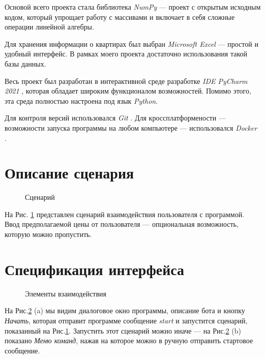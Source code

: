 \documentclass{article}
\begin{document}
		Основой всего проекта стала библиотека \textit{NumPy} \cite{litlink3} --- проект с открытым исходным кодом, который упрощает работу с массивами и включает в себя сложные операции линейной алгебры. 
		
		Для хранения информации о квартирах был выбран \textit{Microsoft Excel} \cite{litlink4} --- простой и удобный интерфейс. В рамках моего проекта достаточно использования такой базы данных.
		
		Весь проект был разработан в интерактивной среде разработке \textit{IDE PyCharm 2021} \cite{litlink5}, которая обладает широким функционалом возможностей. Помимо этого, эта среда полностью настроена под язык \textit{Python}.
		
		Для контроля версий использовался \textit{Git} \cite{litlink6}. Для кроссплатформености --- возможности запуска программы на любом компьютере --- использовался \textit{Docker} \cite{litlink7}.

	\newpage
	\section {Описание сценария}
	
		\begin{figure}[H]
			\centering
			\caption{Сценарий}
			\label{fig:scenery_description}
		\end{figure}
	
		На Рис. \ref{fig:scenery_description} представлен сценарий взаимодействия пользователя с программой. Ввод предполагаемой цены от пользователя --- опциональная возможность, которую можно пропустить.
		
	\newpage
	\section {Спецификация интерфейса}

		\begin{figure}[H]
			\centering
			\hfill %
			\caption{Элементы взаимодействия}
			\label{fig:start_element}
		\end{figure}
	
		На Рис.\ref{fig:start_element} (a) мы видим диалоговое окно программы, описание бота и кнопку \textit{Начать}, которая отправит программе сообщение \textit{start} и запустится сценарий, показанный на Рис.\ref{fig:scenery_description}. Запустить этот сценарий можно иначе --- на Рис.\ref{fig:start_element} (b) показано \textit{Меню команд}, нажав на которое можно в ручную отправить стартовое сообщение.
		
\end{document}
